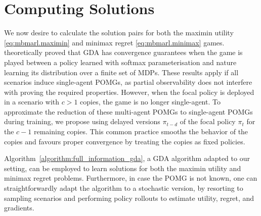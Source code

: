
\section{Computing Solutions}
\label{seq:learning}

We now desire to calculate the solution pairs for both the maximin utility \eqref{eq:mbmarl.maximin} and minimax regret \eqref{eq:mbmarl.minimax} games. \citet{buening_minimax_bayes_reinforcement_2023} theoretically proved that GDA has convergence guarantees when the game is played between a policy learned with softmax parameterisation and nature learning its distribution over a finite set of MDPs. These results apply if all scenarios induce single-agent POMGs, as partial observability does not interfere with proving the required properties. However, when the focal policy is deployed in a scenario with $c>1$ copies, the game is no longer single-agent. To approximate the reduction of these multi-agent POMGs to single-agent POMGs during training, we propose using delayed versions $\pi_{t-d}$ of the focal policy $\pi_{t}$ for the $c-1$ remaining copies. This common practice smooths the behavior of the copies and favours proper convergence by treating the copies as fixed policies.

Algorithm~\ref{algorithm:full_information_gda}, a GDA algorithm adapted to our setting, can be employed to learn solutions for both the maximin utility and minimax regret problems. Furthermore, in case the POMG is not known, one can straightforwardly adapt the algorithm to a stochastic version, by resorting to sampling scenarios and performing policy rollouts to estimate utility, regret, and gradients. 


